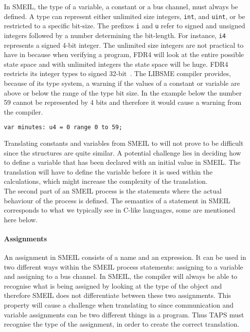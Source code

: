 In SMEIL, the type of a variable, a constant or a bus channel, must always be defined. A type can represent either unlimited size integers, \texttt{int}, and \texttt{uint}, or be restricted to a specific bit-size. The prefixes \texttt{i} and \texttt{u} refer to signed and unsigned integers followed by a number determining the bit-length. For instance, \texttt{i4} represents a signed 4-bit integer. The unlimited size integers are not practical to have in \cspm{} because when verifying a program, FDR4 will look at the entire possible state space and with unlimited integers the state space will be huge. FDR4 restricts its integer types to signed 32-bit~\cite{UniversityofOxford}. The LIBSME compiler provides, because of its type system, a warning if the values of a constant or variable are above or below the range of the type bit size. In the example below the number 59 cannot be represented by 4 bits and therefore it would cause a warning from the compiler.\\
\begin{verbatim}
var minutes: u4 = 0 range 0 to 59;
\end{verbatim}

Translating constants and variables from SMEIL to \cspm{} will not prove to be difficult since the structures are quite similar.
A potential challenge lies in deciding how to define a variable that has been declared with an initial value in SMEIL. The \cspm{} translation will have to define the variable before it is used within the calculations, which might increase the complexity of the translation.\\

The second part of an SMEIL process is the statements where the actual behaviour of the process is defined. The semantics of a statement in SMEIL corresponds to what we typically see in C-like languages, some are mentioned here below.
\paragraph{Assignments}
An assignment in SMEIL consists of a name and an expression. It can be used in two different ways within the SMEIL process statements: assigning to a variable and assigning to a bus channel. In SMEIL, the compiler will always be able to recognise what is being assigned by looking at the type of the object and therefore SMEIL does not differentiate between these two assignments. This property will cause a challenge when translating to \cspm{} since communication and variable assignments can be two different things in a \cspm{} program. Thus TAPS must recognise the type of the assignment, in order to create the correct translation.

